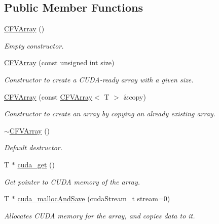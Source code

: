 \subsection*{Public Member Functions}
\begin{DoxyCompactItemize}
\item 
\hyperlink{classFVL_1_1CFVArray_af141a187a6f343f8f0acf258ee9428f5}{CFVArray} ()
\begin{DoxyCompactList}\small\item\em Empty constructor. \item\end{DoxyCompactList}\item 
\hyperlink{classFVL_1_1CFVArray_a4533252544513e80b44814b8afab3190}{CFVArray} (const unsigned int size)
\begin{DoxyCompactList}\small\item\em Constructor to create a CUDA-\/ready array with a given size. \item\end{DoxyCompactList}\item 
\hyperlink{classFVL_1_1CFVArray_a2bfe813d44db8292ff5793db73fe7fe0}{CFVArray} (const \hyperlink{classFVL_1_1CFVArray}{CFVArray}$<$ T $>$ \&copy)
\begin{DoxyCompactList}\small\item\em Constructor to create an array by copying an already existing array. \item\end{DoxyCompactList}\item 
\hyperlink{classFVL_1_1CFVArray_a3c7cfa5d9c6793cd2866030b734b5987}{$\sim$CFVArray} ()
\begin{DoxyCompactList}\small\item\em Default destructor. \item\end{DoxyCompactList}\item 
T $\ast$ \hyperlink{classFVL_1_1CFVArray_aa18ec3374bed8aae707bb943f500cb6f}{cuda\_\-get} ()
\begin{DoxyCompactList}\small\item\em Get pointer to CUDA memory of the array. \item\end{DoxyCompactList}\item 
T $\ast$ \hyperlink{classFVL_1_1CFVArray_af2915e0aeb48486f7210527178f3c1da}{cuda\_\-mallocAndSave} (cudaStream\_\-t stream=0)
\begin{DoxyCompactList}\small\item\em Allocates CUDA memory for the array, and copies data to it. \item\end{DoxyCompactList}\item 

\end{DoxyCompactItemize}
